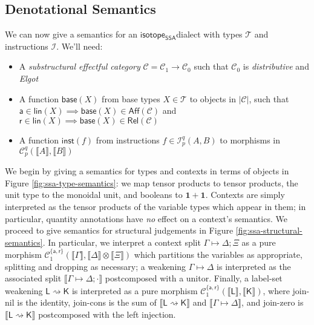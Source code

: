 \documentclass[acmsmall,screen,review]{acmart}
\newcommand{\mc}[1]{\ensuremath{\mathcal{#1}}}
\newcommand{\mb}[1]{\ensuremath{\mathbf{#1}}}
\newcommand{\ms}[1]{\ensuremath{\mathsf{#1}}}
\newcommand{\csplits}[3]{#1 \mapsto #2;#3}
\newcommand{\cwk}[2]{#1 \mapsto #2}
\newcommand{\lwk}[2]{#1 \rightsquigarrow #2}
\newcommand{\rle}[1]{{\scriptsize\textsf{#1}}}
\newcommand{\tint}{{\{\ms{a}, \ms{r}\}}}
\newcommand{\dnt}[1]{\llbracket{#1}\rrbracket}
\newcommand{\isotopessa}{\ms{isotope_{SSA}}}
\begin{document}
\subsection{Denotational Semantics}

We can now give a semantics for an \isotopessa dialect with types
\(\mc{T}\) and instructions \(\mc{I}\). We'll need:
\begin{itemize}
  \item A \textit{substructural effectful category} \(\mc{C} = \mc{C}_1 \to
  \mc{C}_0\) such that \(\mc{C}_0\) is \textit{distributive} and \textit{Elgot}
  \item A function \(\ms{base}(X)\) from base types \(X \in \mc{T}\) to objects
  in \(|\mc{C}|\), such that \(\ms{a} \in \ms{lin}(X) \implies \ms{base}(X) \in
  \ms{Aff}(\mc{C})\) and \(\ms{r} \in \ms{lin}(X) \implies \ms{base}(X) \in
  \ms{Rel}(\mc{C})\)
  \item A function \(\ms{inst}(f)\) from instructions \(f \in \mc{I}_p^q(A, B)\)
  to morphisms in \(\mc{C}_p^q(\dnt{A}, \dnt{B})\)
\end{itemize}
We begin by giving a semantics for types and contexts in terms of objects in
Figure \ref{fig:ssa-type-semantics}: we map tensor products to tensor products,
the unit type to the monoidal unit, and booleans to \(\mb{1} + \mb{1}\).
Contexts are simply interpreted as the tensor products of the variable types
which appear in them; in particular, quantity annotations have \textit{no}
effect on a context's semantics. We proceed to give semantics for structural
judgements in Figure \ref{fig:ssa-structural-semantics}. In particular, we
interpret a context split \(\csplits{\Gamma}{\Delta}{\Xi}\) as a pure morphism
\(\mc{C}^\tint_1(\dnt{\Gamma}, \dnt{\Delta} \otimes \dnt{\Xi})\) which
partitions the variables as appropriate, splitting and dropping as necessary; a
weakening \(\cwk{\Gamma}{\Delta}\) is interpreted as the associated split
\(\dnt{\csplits{\Gamma}{\Delta}{\cdot}}\) postcomposed with a unitor. Finally, a
label-set weakening \(\lwk{\ms{L}}{\ms{K}}\) is interpreted as a pure morphism
\(\mc{C}^\tint_1(\dnt{\ms{L}}, \dnt{\ms{K}})\), where \rle{join-nil} is the
identity, \rle{join-cons} is the sum of \(\dnt{\lwk{\ms{L}}{\ms{K}}}\) and
\(\dnt{\cwk{\Gamma}{\Delta}}\), and \rle{join-zero} is
\(\dnt{\lwk{\ms{L}}{\ms{K}}}\) postcomposed with the left injection.
\end{document}
